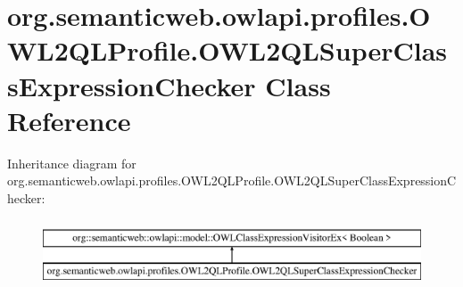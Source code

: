 \hypertarget{classorg_1_1semanticweb_1_1owlapi_1_1profiles_1_1_o_w_l2_q_l_profile_1_1_o_w_l2_q_l_super_class_expression_checker}{\section{org.\-semanticweb.\-owlapi.\-profiles.\-O\-W\-L2\-Q\-L\-Profile.\-O\-W\-L2\-Q\-L\-Super\-Class\-Expression\-Checker Class Reference}
\label{classorg_1_1semanticweb_1_1owlapi_1_1profiles_1_1_o_w_l2_q_l_profile_1_1_o_w_l2_q_l_super_class_expression_checker}
}
Inheritance diagram for org.\-semanticweb.\-owlapi.\-profiles.\-O\-W\-L2\-Q\-L\-Profile.\-O\-W\-L2\-Q\-L\-Super\-Class\-Expression\-Checker\-:\begin{figure}[H]
\begin{center}
\leavevmode
\includegraphics[height=2.000000cm]{classorg_1_1semanticweb_1_1owlapi_1_1profiles_1_1_o_w_l2_q_l_profile_1_1_o_w_l2_q_l_super_class_expression_checker}
\end{center}
\end{figure}
